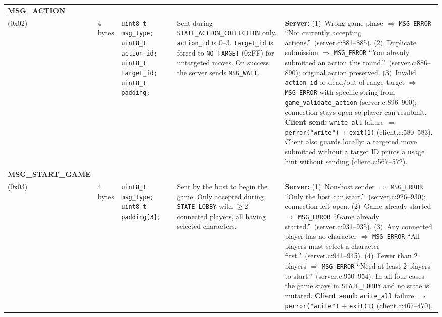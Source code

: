 \documentclass[11pt,letterpaper]{article}
\begin{document}
\begin{longtable}{@{}p{1.8cm} p{1.2cm} p{2.4cm} p{4.2cm} p{4.8cm}@{}}
\textbf{MSG\_ACTION}\\(0x02) &
4 bytes &
\texttt{uint8\_t msg\_type;}\newline
\texttt{uint8\_t action\_id;}\newline
\texttt{uint8\_t target\_id;}\newline
\texttt{uint8\_t padding;} &
Sent during \texttt{STATE\_ACTION\_COLLECTION} only. \texttt{action\_id} is 0--3. \texttt{target\_id} is forced to \texttt{NO\_TARGET} (0xFF) for untargeted moves. On success the server sends \texttt{MSG\_WAIT}. &
\textbf{Server:} (1)~Wrong game phase $\Rightarrow$ \texttt{MSG\_ERROR} ``Not currently accepting actions.''\ (server.c:881--885). (2)~Duplicate submission $\Rightarrow$ \texttt{MSG\_ERROR} ``You already submitted an action this round.''\ (server.c:886--890); original action preserved. (3)~Invalid \texttt{action\_id} or dead/out-of-range target $\Rightarrow$ \texttt{MSG\_ERROR} with specific string from \texttt{game\_validate\_action} (server.c:896--900); connection stays open so player can resubmit. \textbf{Client send:} \texttt{write\_all} failure $\Rightarrow$ \texttt{perror("write")} + \texttt{exit(1)} (client.c:580--583). Client also guards locally: a targeted move submitted without a target ID prints a usage hint without sending (client.c:567--572). \\[4pt]
\newpage

\textbf{MSG\_START\_GAME}\\(0x03) &
4 bytes &
\texttt{uint8\_t msg\_type;}\newline
\texttt{uint8\_t padding[3];} &
Sent by the host to begin the game. Only accepted during \texttt{STATE\_LOBBY} with $\geq$2 connected players, all having selected characters. &
\textbf{Server:} (1)~Non-host sender $\Rightarrow$ \texttt{MSG\_ERROR} ``Only the host can start.''\ (server.c:926--930); connection left open. (2)~Game already started $\Rightarrow$ \texttt{MSG\_ERROR} ``Game already started.''\ (server.c:931--935). (3)~Any connected player has no character $\Rightarrow$ \texttt{MSG\_ERROR} ``All players must select a character first.''\ (server.c:941--945). (4)~Fewer than 2 players $\Rightarrow$ \texttt{MSG\_ERROR} ``Need at least 2 players to start.''\ (server.c:950--954). In all four cases the game stays in \texttt{STATE\_LOBBY} and no state is mutated. \textbf{Client send:} \texttt{write\_all} failure $\Rightarrow$ \texttt{perror("write")} + \texttt{exit(1)} (client.c:467--470). \\[4pt]


\end{longtable}
\end{document}

